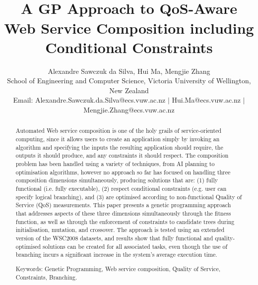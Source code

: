 \documentclass[conference]{IEEEtran}
\begin{document}
\title{\ \\ \LARGE\bf A GP Approach to QoS-Aware Web Service Composition including Conditional Constraints \vspace{-0.5cm}}
\vspace{-8cm}
\author{Alexandre Sawczuk da Silva, Hui Ma, Mengjie Zhang\\ \small School of
Engineering and Computer Science, Victoria University of Wellington, New Zealand\\
Email: Alexandre.Sawczuk.da.Silva@ecs.vuw.ac.nz $|$ Hui.Ma@ecs.vuw.ac.nz $|$
Mengjie.Zhang@ecs.vuw.ac.nz \vspace{0.5cm}}

\maketitle

\begin{abstract}
Automated Web service composition is one of the holy grails of service-oriented computing, since it allows users to create an application simply by invoking
an algorithm and specifying the inputs the resulting application should require, the outputs it should produce, and any constraints it should respect. The composition
problem has been handled using a variety of techniques, from AI planning to optimisation algorithms, however no approach so far has focused on handling three composition dimensions
simultaneously, producing solutions that are: (1) fully functional (i.e. fully executable), (2) respect conditional constraints (e.g. user can specify logical branching), and (3) are optimised according to non-functional Quality of Service (QoS) measurements. This paper presents a genetic programming approach that addresses aspects of these three
dimensions simultaneously through the fitness function, as well as through the enforcement of constraints to candidate trees during initialisation, mutation, and crossover. The approach
is tested using an extended version of the WSC2008 datasets, and results show that fully functional and quality-optimised solutions can be created for all associated tasks, even though the use of branching incurs a significant increase in the system's average execution time.

Keywords: Genetic Programming, Web service composition, Quality of Service, Constraints, Branching.

\end{abstract}

\IEEEpeerreviewmaketitle
\end{document}
